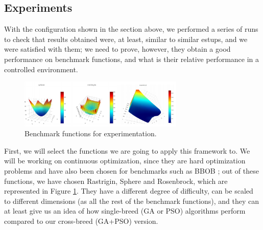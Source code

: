 \documentclass[runningheads]{llncs}
\begin{document}
  \subsection{Experiments}

With the configuration shown in the section above, we performed a
series of runs to check that results obtained were, at least, similar
to similar estups, and we were satisfied with them; we need to prove,
however, they obtain a good performance on benchmark functions, and
what is their relative performance in a controlled environment.

%
\begin{figure}[htp]
  \centering
    \includegraphics[width=0.7\textwidth]{img/benchmark.png}
    \caption{Benchmark functions for experimentation.} \label{fig:functions}
    \end{figure}
%
First, we will select the functions we are going to apply this
framework to. We will be working on continuous optimization, since
they are hard optimization problems and have also been chosen for
benchmarks such as BBOB \cite{hansen2010bbob}; out of these functions,
we have chosen Rastrigin, Sphere and Rosenbrock, which are represented
in Figure \ref{fig:functions}. They have a different
degree of difficulty, can be scaled to different dimensions (as all
the rest of the benchmark functions), and they can at least give us an
idea of how single-breed (GA or PSO) algorithms perform compared to
our cross-breed (GA+PSO) version.
%
\end{document}

